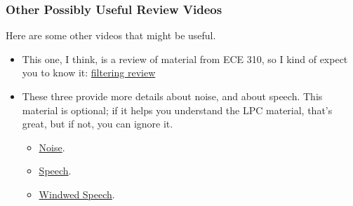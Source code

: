 \documentclass{beamer}
\begin{document}
\begin{frame}
  \frametitle{Other Possibly Useful Review Videos}

  Here are some other videos that might be useful.
  \begin{itemize}
  \item This one, I think, is a review of material from ECE 310, so I
    kind of expect you to know it:
    \href{https://mediaspace.illinois.edu/media/t/1_7vbishf8/26816181}{filtering review}
  \item These three provide more details about noise, and about
    speech.  This material is optional; if it helps you understand the
    LPC material, that's great, but if not, you can ignore it.
    \begin{itemize}
      \item \href{https://mediaspace.illinois.edu/media/t/1_naudxmet/26816181}{Noise}.
      \item \href{https://mediaspace.illinois.edu/media/t/1_gm5xuh5g/26816181}{Speech}.
      \item \href{https://mediaspace.illinois.edu/media/t/1_2839d36o/26816181}{Windwed Speech}.
    \end{itemize}
  \end{itemize}
\end{frame}
\end{document}
